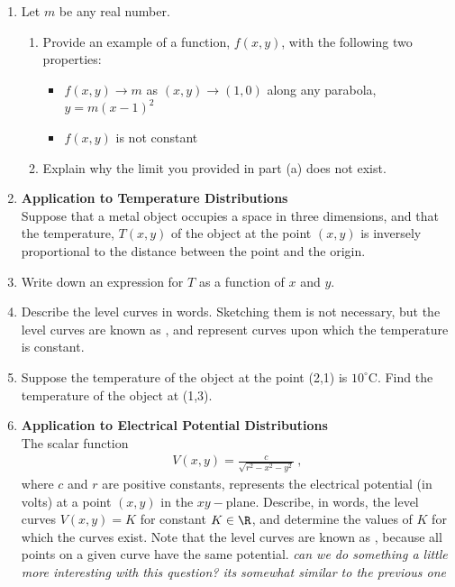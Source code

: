 \begin{enumerate}
\item Let $m$ be any real number. 
\begin{enumerate}
\item Provide an example of a function, $f(x,y)$, with the following two properties:
\begin{itemize}
\item $f(x,y) \rightarrow m$ as $(x,y) \rightarrow (1,0)$ along any parabola, $y=m(x-1)^2$
\item $f(x,y)$ is not constant
\end{itemize}
\item Explain why the limit you provided in part (a) does not exist. 
\end{enumerate}
\item \textbf{Application to Temperature Distributions}\\
Suppose that a metal object occupies a space in three dimensions, and that the temperature, $T(x,y)$ of the object at the point $(x,y)$ is inversely proportional to the distance between the point and the origin. 
\BEN
\item Write down an expression for $T$ as a function of $x$ and $y$.
\item Describe the level curves in words. Sketching them is not necessary, but the level curves are known as , and represent curves upon which the temperature is constant. 
\item Suppose the temperature of the object at the point (2,1) is $10^{\circ}$C. Find the temperature of the object at (1,3).
\EEN
\item \textbf{Application to Electrical Potential Distributions}\\
The scalar function
\begin{align*}
V(x,y) = \frac{c}{\sqrt{r^2 - x^2 -y^2}}\ ,
\end{align*}
where $c$ and $r$ are positive constants, represents the electrical potential (in volts) at a point $(x,y)$ in the $xy-$plane. Describe, in words, the level curves $V(x,y)=K$ for constant $K\in\R$, and determine the values of $K$ for which the curves exist. Note that the level curves are known as , because all points on a given curve have the same potential. \textit{can we do something a little more interesting with this question? its somewhat similar to the previous one}


\end{enumerate}
